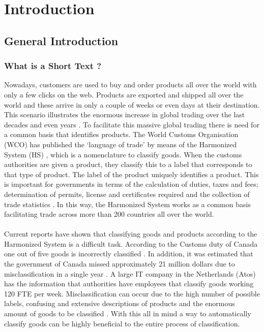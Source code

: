 \chapter{Introduction}\label{ch:intro}
\section{General Introduction}
\subsection{What is a Short Text ?}

Nowadays, customers are used to buy and order products all over the world with only a few clicks on the web. Products are exported and shipped all over the world and these arrive in only a couple of weeks or even days at their destination. This scenario illustrates the enormous increase in global trading over the last decades \cite{owidtradeandglobalization} and even years \cite{book1}. To facilitate this massive global trading there is need for a common basis that identifies products. The World Customs Organisation (WCO) has published the ‘language of trade’ by means of the Harmonized System (HS) \cite{misc1}, which is a nomenclature to classify goods. When the customs authorities are given a product, they classify this to a label that corresponds to that type of product. The label of the product uniquely identifies a product. This is important for governments in terms of the calculation of duties, taxes and fees; determination of permits, license and certificates required and the collection of trade statistics \cite{Ding2015}. In this way, the Harmonized System works as a common basis facilitating trade across more than 200 countries all over the world.\\
\\
Current reports have shown that classifying goods and products according to the Harmonized System is a difficult task. According to the Customs duty of Canada one out of five goods is incorrectly classified \cite{AuditorGeneralofCanada2017}. In addition, it was estimated that the government of Canada missed approximately 21 million dollars due to misclassification in a single year \cite{AuditorGeneralofCanada2017}. A large IT company in the Netherlands (Atos) has the information that authorities have employees that classify goods working 120 FTE per week. Misclassification can occur due to the high number of possible labels, confusing and extensive descriptions of products and the enormous amount of goods to be classified \cite{Kappler2011}. With this all in mind a way to automatically classify goods can be highly beneficial to the entire process of classification.\\
